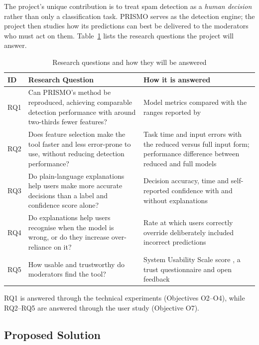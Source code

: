 The project's unique contribution is to treat spam detection as a \emph{human decision} rather than only a classification task. PRISMO serves as the detection engine; the project then studies how its predictions can best be delivered to the moderators who must act on them. Table~\ref{tab:rqs} lists the research questions the project will answer.

\begin{table}[htbp]
\centering
\caption{Research questions and how they will be answered}
\label{tab:rqs}
\begin{tabularx}{\textwidth}{@{}l >{\raggedright\arraybackslash}X >{\raggedright\arraybackslash}p{}@{}}
  \toprule
  \textbf{ID} & \textbf{Research Question} & \textbf{How it is answered} \\
  \midrule
  RQ1 & Can PRISMO's method be reproduced, achieving comparable detection performance with around two-thirds fewer features? & Model metrics compared with the ranges reported by \textcite{agrawal2018prismo} \\
  \addlinespace
  RQ2 & Does feature selection make the tool faster and less error-prone to use, without reducing detection performance? & Task time and input errors with the reduced versus full input form; performance difference between reduced and full models \\
  \addlinespace
  RQ3 & Do plain-language explanations help users make more accurate decisions than a label and confidence score alone? & Decision accuracy, time and self-reported confidence with and without explanations \\
  \addlinespace
  RQ4 & Do explanations help users recognise when the model is wrong, or do they increase over-reliance on it? & Rate at which users correctly override deliberately included incorrect predictions \\
  \addlinespace
  RQ5 & How usable and trustworthy do moderators find the tool? & System Usability Scale score \parencite{brooke1996sus}, a trust questionnaire and open feedback \\
  \bottomrule
\end{tabularx}
\end{table}

RQ1 is answered through the technical experiments (Objectives O2--O4), while RQ2--RQ5 are answered through the user study (Objective O7).

\subsection{Proposed Solution}\label{sec:solution}

